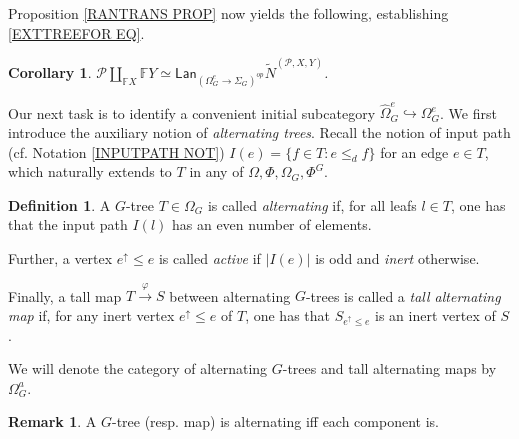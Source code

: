 \documentclass[a4paper,10pt
,draft
]{article}%
\numberwithin{equation}{section}
\numberwithin{figure}{section}
\newtheorem{corollary}[equation]{Corollary}%
\theoremstyle{definition} %
\newtheorem{definition}[equation]{Definition}%
\newtheorem{remark}[equation]{Remark}%
\newcommand{\1}{\ensuremath{\mathbbm 1}}%
\begin{document}
Proposition \ref{RANTRANS PROP} now yields the following, establishing \eqref{EXTTREEFOR EQ}.

\begin{corollary}\label{ESTABDESC COR}
	$\mathcal P \coprod\limits_{\mathbb F X} \mathbb F Y \simeq \mathsf{Lan}_{(\Omega_G^e \to \Sigma_G)^{op}}\tilde N^{(\mathcal P, X,Y)}$.
\end{corollary}


Our next task is to identify a convenient initial subcategory
$\widehat{\Omega}_G^{e} \hookrightarrow \Omega_G^e$.
We first introduce the auxiliary notion of \emph{alternating trees}.
Recall the notion of input path (cf. Notation \ref{INPUTPATH NOT})
$I(e) = \{f \in T \colon e \leq_d f\}$ for an edge $e \in T$, which naturally extends to $T$ in any of $\Omega, \Phi, \Omega_G, \Phi^G$.


\begin{definition}\label{OMEGAA DEF}
A $G$-tree $T \in \Omega_G$ is called \textit{alternating} if, 
for all leafs $l \in T$,
one has that the input path $I(l)$ has an even number of elements.

Further, a vertex $e^{\uparrow} \leq e$ is called \textit{active}
if $|I(e)|$ is odd and \textit{inert} otherwise.

Finally, a tall map $T \xrightarrow{\varphi} S$ between alternating $G$-trees is called a 
\textit{tall alternating map} if,
for any inert vertex $e^{\uparrow} \leq e$ of $T$,
one has that $S_{e^{\uparrow} \leq e}$ is an inert vertex of $S$.

We will denote the category of alternating $G$-trees and tall alternating maps by $\Omega_G^a$.
\end{definition}

\begin{remark}
	A $G$-tree (resp. map) is alternating
	iff each component is.
\end{remark}
\end{document}
